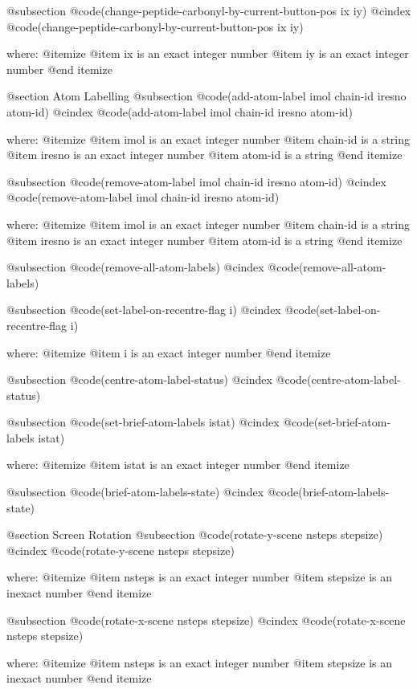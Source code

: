 @subsection @code{(change-peptide-carbonyl-by-current-button-pos ix iy)}
@cindex @code{(change-peptide-carbonyl-by-current-button-pos ix iy)}
 
where: 
 @itemize 
     @item ix is an exact integer number
     @item iy is an exact integer number
 @end itemize



@section Atom Labelling 
@subsection @code{(add-atom-label imol chain-id iresno atom-id)}
@cindex @code{(add-atom-label imol chain-id iresno atom-id)}
 
where: 
 @itemize 
     @item imol is an exact integer number
     @item chain-id is a string
     @item iresno is an exact integer number
     @item atom-id is a string
 @end itemize


@subsection @code{(remove-atom-label imol chain-id iresno atom-id)}
@cindex @code{(remove-atom-label imol chain-id iresno atom-id)}
 
where: 
 @itemize 
     @item imol is an exact integer number
     @item chain-id is a string
     @item iresno is an exact integer number
     @item atom-id is a string
 @end itemize


@subsection @code{(remove-all-atom-labels)}
@cindex @code{(remove-all-atom-labels)}
 
@subsection @code{(set-label-on-recentre-flag i)}
@cindex @code{(set-label-on-recentre-flag i)}
 
where: 
 @itemize 
     @item i is an exact integer number
 @end itemize


@subsection @code{(centre-atom-label-status)}
@cindex @code{(centre-atom-label-status)}
 
@subsection @code{(set-brief-atom-labels istat)}
@cindex @code{(set-brief-atom-labels istat)}
 
where: 
 @itemize 
     @item istat is an exact integer number
 @end itemize


@subsection @code{(brief-atom-labels-state)}
@cindex @code{(brief-atom-labels-state)}
 

@section Screen Rotation 
@subsection @code{(rotate-y-scene nsteps stepsize)}
@cindex @code{(rotate-y-scene nsteps stepsize)}
 
where: 
 @itemize 
     @item nsteps is an exact integer number
     @item stepsize is an inexact number
 @end itemize


@subsection @code{(rotate-x-scene nsteps stepsize)}
@cindex @code{(rotate-x-scene nsteps stepsize)}
 
where: 
 @itemize 
     @item nsteps is an exact integer number
     @item stepsize is an inexact number
 @end itemize


